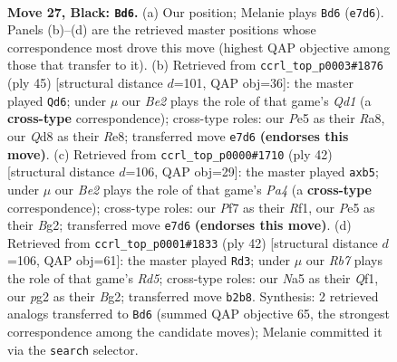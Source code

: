 \documentclass[11pt]{article}
\begin{document}
\clearpage

\begin{figure}[p]\centering
\begin{subfigure}{0.46\textwidth}\centering
\resizebox{\linewidth}{!}{%
\newchessgame
\chessboard[
  setfen={2bq3r/2n1bpk1/p5p1/n1B1p2p/P3P3/N2PQ2N/BrP1RPPP/R4K2 b - - 7 27},
  showmover=false,
  pgfstyle=straightmove, color=movearrow, markmove={e7-d6}
]}
\caption{}
\end{subfigure}\hfill
\begin{subfigure}{0.46\textwidth}\centering
\resizebox{\linewidth}{!}{%
\newchessgame
\chessboard[
  setfen={r2qr1kb/1p3p1p/p5p1/PbpP2B1/2n1PQ2/2N3NP/5PP1/R1R3K1 b - - 5 23},
  showmover=false,
  pgfstyle=straightmove, color=movearrow, markmove={d8-d6}
]}
\caption{}
\end{subfigure}
\\[4pt]
\begin{subfigure}{0.46\textwidth}\centering
\resizebox{\linewidth}{!}{%
\newchessgame
\chessboard[
  setfen={r3r1k1/bp1b1pp1/3pnq1p/1p2p3/P7/2BPPNPP/2Q2PBK/1R3R2 w - - 0 22},
  showmover=false,
  pgfstyle=straightmove, color=movearrow, markmove={a4-b5}
]}
\caption{}
\end{subfigure}\hfill
\begin{subfigure}{0.46\textwidth}\centering
\resizebox{\linewidth}{!}{%
\newchessgame
\chessboard[
  setfen={rq2r1k1/p4p1p/1p1b1np1/n1pR4/8/4BNP1/PP3PBP/R4QK1 w - - 1 22},
  showmover=false,
  pgfstyle=straightmove, color=movearrow, markmove={d5-d3}
]}
\caption{}
\end{subfigure}
\caption{\textbf{Move 27, Black: \texttt{Bd6}.} (a) Our position; Melanie plays \texttt{Bd6} (\texttt{e7d6}). Panels (b)--(d) are the retrieved master positions whose correspondence most drove this move (highest QAP objective among those that transfer to it). (b) Retrieved from \texttt{ccrl\_top\_p0003\#1876} (ply 45) [structural distance $d$=101, QAP obj=36]: the master played \texttt{Qd6}; under $\mu$ our \emph{Be2} plays the role of that game's \emph{Qd1} (a \textbf{cross-type} correspondence); cross-type roles: our \emph{P}e5 as their \emph{R}a8, our \emph{Q}d8 as their \emph{R}e8; transferred move \texttt{e7d6} \textbf{(endorses this move)}. (c) Retrieved from \texttt{ccrl\_top\_p0000\#1710} (ply 42) [structural distance $d$=106, QAP obj=29]: the master played \texttt{axb5}; under $\mu$ our \emph{Be2} plays the role of that game's \emph{Pa4} (a \textbf{cross-type} correspondence); cross-type roles: our \emph{P}f7 as their \emph{R}f1, our \emph{P}e5 as their \emph{B}g2; transferred move \texttt{e7d6} \textbf{(endorses this move)}. (d) Retrieved from \texttt{ccrl\_top\_p0001\#1833} (ply 42) [structural distance $d$=106, QAP obj=61]: the master played \texttt{Rd3}; under $\mu$ our \emph{Rb7} plays the role of that game's \emph{Rd5}; cross-type roles: our \emph{N}a5 as their \emph{Q}f1, our \emph{p}g2 as their \emph{B}g2; transferred move \texttt{b2b8}. Synthesis: 2 retrieved analogs transferred to \texttt{Bd6} (summed QAP objective 65, the strongest correspondence among the candidate moves); Melanie committed it via the \texttt{search} selector.}
\label{fig:thought-m53}
\end{figure}
\end{document}
